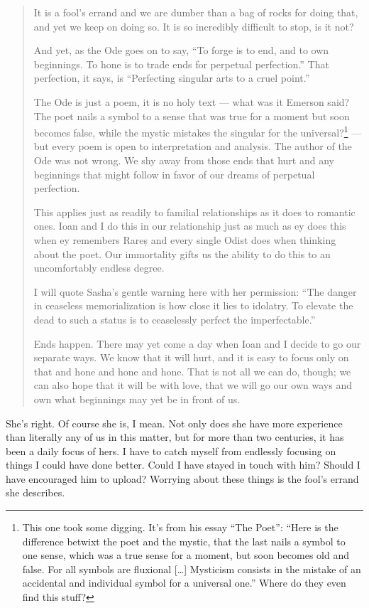 \begin{quote}
It is a fool's errand and we are dumber than a bag of rocks for doing that, and yet we keep on doing so. It is so incredibly difficult to stop, is it not?

And yet, as the Ode goes on to say, ``To forge is to end, and to own beginnings. To hone is to trade ends for perpetual perfection.'' That perfection, it says, is ``Perfecting singular arts to a cruel point.''

The Ode is just a poem, it is no holy text — what was it Emerson said? The poet nails a symbol to a sense that was true for a moment but soon becomes false, while the mystic mistakes the singular for the universal?\footnote{This one took some digging. It's from his essay ``The Poet'': ``Here is the difference betwixt the poet and the mystic, that the last nails a symbol to one sense, which was a true sense for a moment, but soon becomes old and false. For all symbols are fluxional {[}\ldots{]} Mysticism consists in the mistake of an accidental and individual symbol for a universal one.'' Where do they even find this stuff?} — but every poem is open to interpretation and analysis. The author of the Ode was not wrong. We shy away from those ends that hurt and any beginnings that might follow in favor of our dreams of perpetual perfection.

This applies just as readily to familial relationships as it does to romantic ones. Ioan and I do this in our relationship just as much as ey does this when ey remembers Rareș and every single Odist does when thinking about the poet. Our immortality gifts us the ability to do this to an uncomfortably endless degree.

I will quote Sasha's gentle warning here with her permission: ``The danger in ceaseless memorialization is how close it lies to idolatry. To elevate the dead to such a status is to ceaselessly perfect the imperfectable.''

Ends happen. There may yet come a day when Ioan and I decide to go our separate ways. We know that it will hurt, and it is easy to focus only on that and hone and hone and hone. That is not all we can do, though; we can also hope that it will be with love, that we will go our own ways and own what beginnings may yet be in front of us.
\end{quote}

She's right. Of course she is, I mean. Not only does she have more experience than literally any of us in this matter, but for more than two centuries, it has been a daily focus of hers. I have to catch myself from endlessly focusing on things I could have done better. Could I have stayed in touch with him? Should I have encouraged him to upload? Worrying about these things is the fool's errand she describes.

